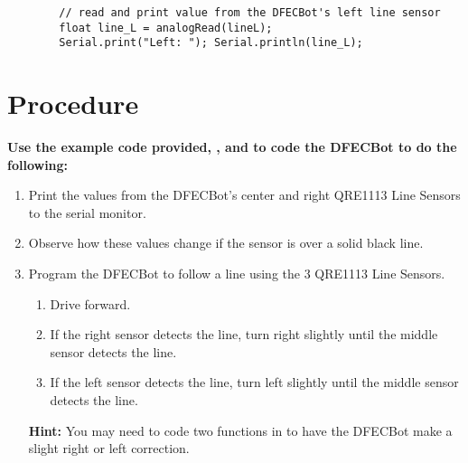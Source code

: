 \documentclass{handout}
\begin{document}
	\begin{lstlisting}
		// read and print value from the DFECBot's left line sensor
		float line_L = analogRead(lineL);
		Serial.print("Left: "); Serial.println(line_L);
	\end{lstlisting}
	
	\newpage
	\clearpage
	\pagebreak
	
	\section{Procedure}
	\textbf{Use the example code provided, , and  to code the DFECBot to do the following:}
		
	\begin{enumerate}
		\item Print the values from the DFECBot's center and right QRE1113 Line Sensors to the serial monitor.
		\item Observe how these values change if the sensor is over a solid black line.
		\item Program the DFECBot to follow a line using the 3 QRE1113 Line Sensors.
			\begin{enumerate}
				\item Drive forward.
				\item If the right sensor detects the line, turn right slightly until the middle sensor detects the line.
				\item If the left sensor detects the line, turn left slightly until the middle sensor detects the line.
			\end{enumerate}
		
			\textbf{Hint:} You may need to code two functions in  to have the DFECBot make a slight right or left correction.
	\end{enumerate} 	
\end{document}
